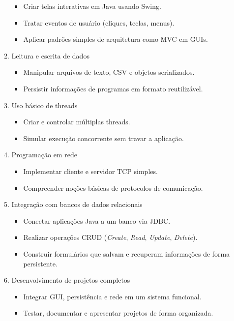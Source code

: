 \documentclass[a4paper, 12pt]{article}
\begin{document}
\begin{itemize}
\begin{enumerate}
                \begin{itemize}
                    \item Criar telas interativas em Java usando Swing.
                    \item Tratar eventos de usuário (cliques, teclas, menus).
                    \item Aplicar padrões simples de arquitetura como MVC em GUIs.
                \end{itemize}
            \item Leitura e escrita de dados
                \begin{itemize}
                    \item Manipular arquivos de texto, CSV e objetos serializados.
                    \item Persistir informações de programas em formato reutilizável.
                \end{itemize}
            \item Uso básico de threads
                \begin{itemize}
                    \item Criar e controlar múltiplas threads.
                    \item Simular execução concorrente sem travar a aplicação.
                \end{itemize}
            \item Programação em rede
                \begin{itemize}
                    \item Implementar cliente e servidor TCP simples.
                    \item Compreender noções básicas de protocolos de comunicação.
                \end{itemize}
            \item Integração com bancos de dados relacionais
                \begin{itemize}
                    \item Conectar aplicações Java a um banco via JDBC.
                    \item Realizar operações CRUD (\textit{Create}, \textit{Read}, \textit{Update}, \textit{Delete}).
                    \item Construir formulários que salvam e recuperam informações de forma persistente.
                \end{itemize}
            \item Desenvolvimento de projetos completos
                \begin{itemize}
                    \item Integrar GUI, persistência e rede em um sistema funcional.
                    \item Testar, documentar e apresentar projetos de forma organizada.
                \end{itemize}
        \end{enumerate}
\end{itemize}
\end{document}
